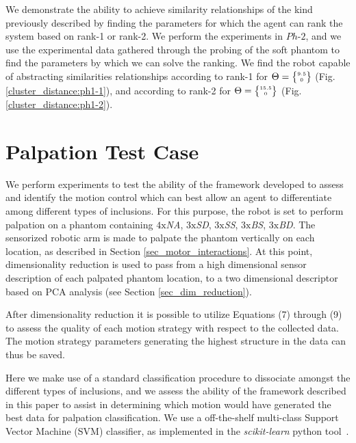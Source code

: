 We demonstrate the ability to achieve similarity relationships of the kind previously described by 
finding the parameters for which the agent can rank the system based on rank-1 or rank-2. We perform 
the experiments in $Ph\text{-}2$, and we use the experimental data gathered through the probing of the soft 
phantom to find the parameters by which we can solve the ranking. We find the robot capable of 
abstracting similarities relationships according to rank-1 for $\Theta = \tiny{\begin{Bmatrix}9.5\\ 0\end{Bmatrix}}$ (Fig. \ref{cluster_distance:ph1-1}), and according to rank-2 for $\Theta = \tiny{\begin{Bmatrix}15.5\\ 0\end{Bmatrix}}$ (Fig. \ref{cluster_distance:ph1-2}).


\section{Palpation Test Case} \label{sec_test_case}

We perform experiments to test the ability of the framework developed to assess and identify the motion control which can best allow an agent to differentiate among different types of inclusions. For this purpose, the robot is set to perform palpation on a phantom containing $4\text{x}$\textit{NA}, $3\text{x}$\textit{SD}, $3\text{x}$\textit{SS}, $3\text{x}$\textit{BS}, $3\text{x}$\textit{BD}. The sensorized robotic arm is made to palpate the phantom vertically on each location, as described in Section \ref{sec_motor_interactions}.  
At this point, dimensionality reduction is used to pass from a high dimensional sensor description of each palpated phantom location, to a two dimensional descriptor based on PCA analysis (see Section \ref{sec_dim_reduction}).

After dimensionality reduction it is possible to utilize Equations (7) through (9) to assess the quality of each motion strategy with respect to the collected data. The motion strategy parameters generating the highest structure in the data can thus be saved.

Here we make use of a standard classification procedure to dissociate amongst the different types of inclusions, and we assess the ability of the framework described in this paper to assist in determining which motion would have generated the best data for palpation classification.  We use a off-the-shelf multi-class Support Vector Machine (SVM) \cite{cortes1995support} classifier, as implemented in the \emph{scikit-learn} python tool~\cite{scikit-learn}. 

